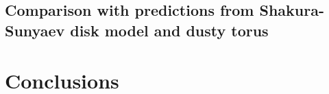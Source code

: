 \subsection{Comparison with predictions from Shakura-Sunyaev disk model and dusty torus}

\section{Conclusions}
